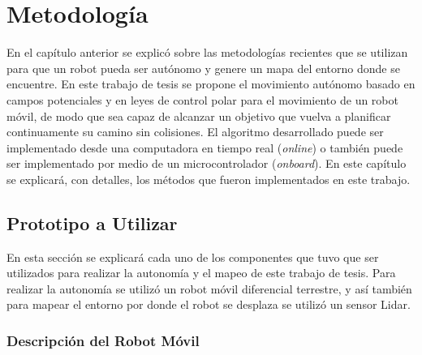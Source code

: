 \chapter{Metodolog\'ia}

En el cap\'itulo anterior se explic\'o sobre las metodolog\'ias recientes que se 
utilizan para que un robot pueda ser aut\'onomo y genere un mapa 
del entorno donde se encuentre. En este trabajo de tesis se propone 
el movimiento aut\'onomo basado en campos potenciales y en leyes de control 
polar para el movimiento de un robot m\'ovil, de modo que sea capaz de alcanzar 
un objetivo que vuelva a planificar continuamente su camino sin colisiones. El 
algoritmo desarrollado puede ser implementado desde una computadora en tiempo 
real (\textit{online}) o tambi\'en puede ser implementado por medio de un 
microcontrolador (\textit{onboard}). En este cap\'itulo se explicar\'a, con detalles, 
los m\'etodos que fueron implementados en este trabajo.

\section{Prototipo a Utilizar}
En esta secci\'on se explicar\'a cada uno de los componentes que tuvo que 
ser utilizados para realizar la autonom\'ia y el mapeo de este trabajo de 
tesis. Para realizar la autonom\'ia se utiliz\'o un robot m\'ovil diferencial 
terrestre, y as\'i tambi\'en para mapear el entorno por donde el robot se 
desplaza se utiliz\'o un sensor Lidar.

\subsection{Descripci\'on del Robot M\'ovil}

